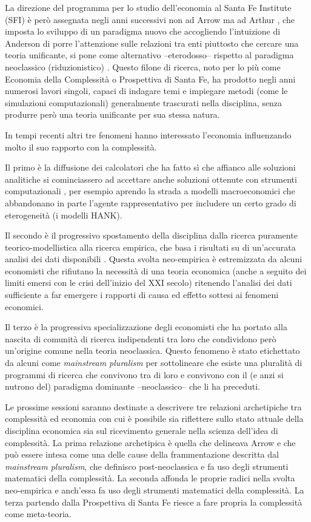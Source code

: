 \documentclass[a4paper, headings=standardclasses]{scrartcl}
\begin{document}
La direzione del programma per lo studio dell'economia al Santa Fe Institute (SFI) è però assegnata negli anni successivi non ad Arrow ma ad Arthur \parencite{fontana2010a}, che imposta lo sviluppo di un paradigma nuovo che accogliendo l'intuizione di Anderson di porre l'attenzione sulle relazioni tra enti piuttosto che cercare una teoria unificante, si pone come alternativo --eterodosso-- rispetto al paradigma neoclassico (riduzionistico) \parencite{arthur2021, fontana2010}.
Questo filone di ricerca, noto per lo più come Economia della Complessità o Prospettiva di Santa Fe, ha prodotto negli anni numerosi lavori singoli, capaci di indagare temi e impiegare metodi (come le simulazioni computazionali) generalmente trascurati nella disciplina, senza produrre però una teoria unificante per sua stessa natura.

In tempi recenti altri tre fenomeni hanno interessato l'economia influenzando molto il suo rapporto con la complessità.

Il primo è la diffusione dei calcolatori che ha fatto sì che affianco alle soluzioni analitiche si cominciassero ad accettare anche soluzioni ottenute con strumenti computazionali \parencite{cherrier2023, backhouse2016}, per esempio aprendo la strada a modelli macroeconomici che abbandonano in parte l'agente rappresentativo per includere un certo grado di eterogeneità (i modelli HANK).

Il secondo è il progressivo spostamento della disciplina dalla ricerca puramente teorico-modellistica alla ricerca empirica, che basa i risultati su di un'accurata analisi dei dati disponibili \parencite{cherrier2018, backhouse2017}.
Questa svolta neo-empirica è estremizzata da alcuni economisti che rifiutano la necessità di una teoria economica (anche a seguito dei limiti emersi con le crisi dell'inizio del XXI secolo) ritenendo l'analisi dei dati sufficiente a far emergere i rapporti di causa ed effetto sottesi ai fenomeni economici.

Il terzo è la progressiva specializzazione degli economisti che ha portato alla nascita di comunità di ricerca indipendenti tra loro che condividono però un'origine comune nella teoria neoclassica. Questo fenomeno è stato etichettato da alcuni come \textit{mainstream pluralism} \parencite{cedrini2018, davis2006, davis2019a} per sottolineare che esiste una pluralità di programmi di ricerca che convivono tra di loro e convivono con il (e anzi si nutrono del) paradigma dominante --neoclassico-- che li ha preceduti.

Le prossime sessioni saranno destinate a descrivere tre relazioni archetipiche tra complessità ed economia con cui è possibile sia riflettere sullo stato attuale della disciplina economica sia sul ricevimento generale nella scienza dell'idea di complessità.
La prima relazione archetipica è quella che delineava Arrow e che può essere intesa come una delle cause della frammentazione descritta dal \textit{mainstream pluralism}, che definisco post-neoclassica e fa uso degli strumenti matematici della complessità.
La seconda affonda le proprie radici nella svolta neo-empirica e anch'essa fa uso degli strumenti matematici della complessità.
La terza partendo dalla Prospettiva di Santa Fe riesce a fare propria la complessità come meta-teoria.
\end{document}
